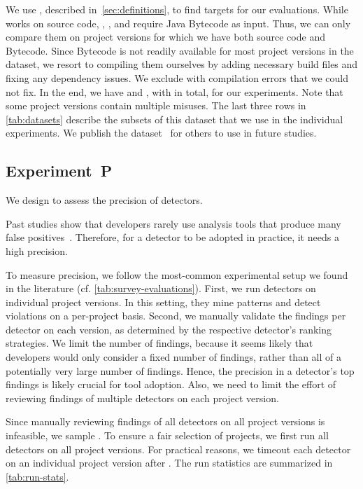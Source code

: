 We use \MUBench, described in~\autoref{sec:definitions}, to find targets for our evaluations.
While \GROUMiner{} works on source code, \Jadet{}, \Tikanga{}, and \DMMC{} require Java Bytecode as input.
Thus, we can only compare them on project versions for which we have both source code and Bytecode.
Since Bytecode is not readily available for most project versions in the dataset, we resort to compiling them ourselves by adding necessary build files and fixing any dependency issues.
We exclude  with compilation errors that we could not fix.
In the end, we have  and , with  in total, for our experiments.
Note that some project versions contain multiple misuses.
The last three rows in \autoref{tab:datasets} describe the subsets of this dataset that we use in the individual experiments.
We publish the dataset~\cite{mubench} for others to use in future studies.

\subsection{Experiment~P}
\label{e2}

We design  to assess the precision of detectors.

Past studies show that developers rarely use analysis tools that produce many false positives~\cite{FLLNSSLNSS02,BBCCFHHKME10,JS13}.
Therefore, for a detector to be adopted in practice, it needs a high precision.

To measure precision, we follow the most-common experimental setup we found in the literature (cf. \autoref{tab:survey-evaluations}).
First, we run detectors on individual project versions.
In this setting, they mine patterns and detect violations on a per-project basis.
Second, we manually validate the  findings per detector on each version, as determined by the respective detector's ranking strategies.
We limit the number of findings, because it seems likely that developers would only consider a fixed number of findings, rather than all of a potentially very large number of findings.
Hence, the precision in a detector's top findings is likely crucial for tool adoption.
Also, we need to limit the effort of reviewing findings of multiple detectors on each project version.

Since manually reviewing findings of all detectors on all project versions is infeasible, we sample .
To ensure a fair selection of projects, we first run all detectors on all project versions.
For practical reasons, we timeout each detector on an individual project version after .
The run statistics are summarized in \autoref{tab:run-stats}.

